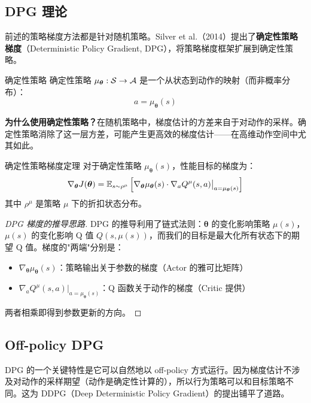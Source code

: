 \subsection{DPG 理论}

前述的策略梯度方法都是针对随机策略。Silver et al.（2014）提出了\textbf{确定性策略梯度}（Deterministic Policy Gradient, DPG），将策略梯度框架扩展到确定性策略。

\begin{mydefinition}{确定性策略}
确定性策略 $\mu_{\boldsymbol{\theta}} : \mathcal{S} \to \mathcal{A}$ 是一个从状态到动作的映射（而非概率分布）：
$$a = \mu_{\boldsymbol{\theta}}(s)$$
\end{mydefinition}

\textbf{为什么使用确定性策略？}在随机策略中，梯度估计的方差来自于对动作的采样。确定性策略消除了这一层方差，可能产生更高效的梯度估计——在高维动作空间中尤其如此。

\begin{myTheorem}{确定性策略梯度定理}
对于确定性策略 $\mu_{\boldsymbol{\theta}}(s)$，性能目标的梯度为：
$$\nabla_{\boldsymbol{\theta}} J(\boldsymbol{\theta}) = \mathbb{E}_{s \sim \rho^{\mu}}\left[ \nabla_{\boldsymbol{\theta}} \mu_{\boldsymbol{\theta}}(s) \cdot \nabla_a Q^{\mu}(s,a) \big|_{a=\mu_{\boldsymbol{\theta}}(s)} \right]$$
其中 $\rho^{\mu}$ 是策略 $\mu$ 下的折扣状态分布。
\end{myTheorem}

\begin{proof}[DPG 梯度的推导思路]
DPG 的推导利用了链式法则：$\boldsymbol{\theta}$ 的变化影响策略 $\mu(s)$，$\mu(s)$ 的变化影响 Q 值 $Q(s,\mu(s))$，而我们的目标是最大化所有状态下的期望 Q 值。梯度的"两端"分别是：
\begin{itemize}
    \item $\nabla_{\boldsymbol{\theta}} \mu_{\boldsymbol{\theta}}(s)$：策略输出关于参数的梯度（Actor 的雅可比矩阵）
    \item $\nabla_a Q^{\mu}(s,a)|_{a=\mu_{\boldsymbol{\theta}}(s)}$：Q 函数关于动作的梯度（Critic 提供）
\end{itemize}
两者相乘即得到参数更新的方向。
\end{proof}

\subsection{Off-policy DPG}

DPG 的一个关键特性是它可以自然地以 off-policy 方式运行。因为梯度估计不涉及对动作的采样期望（动作是确定性计算的），所以行为策略可以和目标策略不同。这为 DDPG（Deep Deterministic Policy Gradient）的提出铺平了道路。

